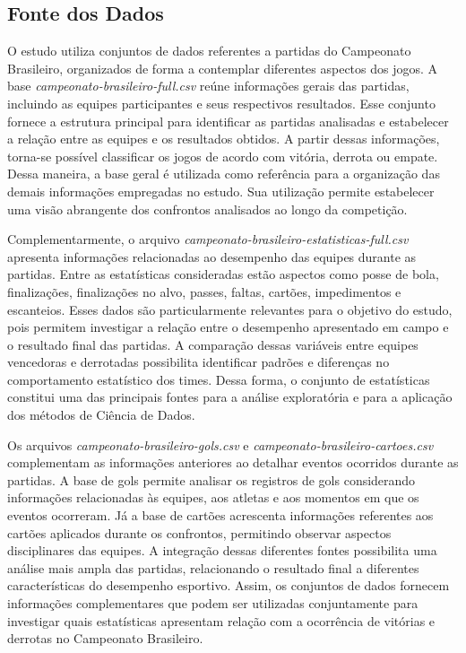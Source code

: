 \documentclass[pdflatex,sn-mathphys-num]{sn-jnl}%
\theoremstyle{thmstyleone}%
\theoremstyle{thmstyletwo}%
\theoremstyle{thmstylethree}%
\begin{document}
\subsection{Fonte dos Dados}

O estudo utiliza conjuntos de dados referentes a partidas do Campeonato Brasileiro, organizados de forma a contemplar diferentes aspectos dos jogos. A base \textit{campeonato-brasileiro-full.csv} reúne informações gerais das partidas, incluindo as equipes participantes e seus respectivos resultados. Esse conjunto fornece a estrutura principal para identificar as partidas analisadas e estabelecer a relação entre as equipes e os resultados obtidos. A partir dessas informações, torna-se possível classificar os jogos de acordo com vitória, derrota ou empate. Dessa maneira, a base geral é utilizada como referência para a organização das demais informações empregadas no estudo. Sua utilização permite estabelecer uma visão abrangente dos confrontos analisados ao longo da competição.

Complementarmente, o arquivo \textit{campeonato-brasileiro-estatisticas-full.csv} apresenta informações relacionadas ao desempenho das equipes durante as partidas. Entre as estatísticas consideradas estão aspectos como posse de bola, finalizações, finalizações no alvo, passes, faltas, cartões, impedimentos e escanteios. Esses dados são particularmente relevantes para o objetivo do estudo, pois permitem investigar a relação entre o desempenho apresentado em campo e o resultado final das partidas. A comparação dessas variáveis entre equipes vencedoras e derrotadas possibilita identificar padrões e diferenças no comportamento estatístico dos times. Dessa forma, o conjunto de estatísticas constitui uma das principais fontes para a análise exploratória e para a aplicação dos métodos de Ciência de Dados.

Os arquivos \textit{campeonato-brasileiro-gols.csv} e \textit{campeonato-brasileiro-cartoes.csv} complementam as informações anteriores ao detalhar eventos ocorridos durante as partidas. A base de gols permite analisar os registros de gols considerando informações relacionadas às equipes, aos atletas e aos momentos em que os eventos ocorreram. Já a base de cartões acrescenta informações referentes aos cartões aplicados durante os confrontos, permitindo observar aspectos disciplinares das equipes. A integração dessas diferentes fontes possibilita uma análise mais ampla das partidas, relacionando o resultado final a diferentes características do desempenho esportivo. Assim, os conjuntos de dados fornecem informações complementares que podem ser utilizadas conjuntamente para investigar quais estatísticas apresentam relação com a ocorrência de vitórias e derrotas no Campeonato Brasileiro.
\end{document}
